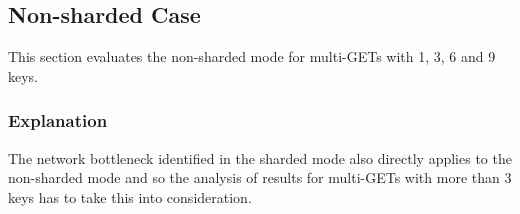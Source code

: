 \documentclass[report.tex]{subfiles}
\begin{document}
\subsection{Non-sharded Case}

This section evaluates the non-sharded mode for multi-GETs with 1, 3, 6 and 9 keys.



\subsubsection{Explanation}

The network bottleneck identified in the sharded mode also directly applies to the non-sharded mode and so the analysis of results for multi-GETs with more than 3 keys has to take this into consideration.
\end{document}
